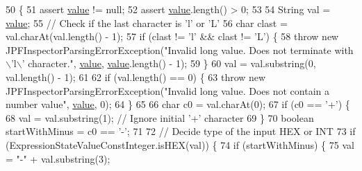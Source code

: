\begin{DoxyCode}
50                                                                                            \{
51     assert \hyperlink{classgov_1_1nasa_1_1jpf_1_1inspector_1_1server_1_1expression_1_1expressions_1_1_expression_state_value_const_long_aca83e5db34ca840e172b2ad55feb8c40}{value} != null;
52     assert \hyperlink{classgov_1_1nasa_1_1jpf_1_1inspector_1_1server_1_1expression_1_1expressions_1_1_expression_state_value_const_long_aca83e5db34ca840e172b2ad55feb8c40}{value}.length() > 0;
53 
54     String val = \hyperlink{classgov_1_1nasa_1_1jpf_1_1inspector_1_1server_1_1expression_1_1expressions_1_1_expression_state_value_const_long_aca83e5db34ca840e172b2ad55feb8c40}{value};
55     \textcolor{comment}{// Check if the last character is 'l' or 'L'}
56     \textcolor{keywordtype}{char} clast = val.charAt(val.length() - 1);
57     \textcolor{keywordflow}{if} (clast != \textcolor{charliteral}{'l'} && clast != \textcolor{charliteral}{'L'}) \{
58       \textcolor{keywordflow}{throw} \textcolor{keyword}{new} JPFInspectorParsingErrorException(\textcolor{stringliteral}{"Invalid long value. Does not terminate with \(\backslash\)'l\(\backslash\)'
       character."}, \hyperlink{classgov_1_1nasa_1_1jpf_1_1inspector_1_1server_1_1expression_1_1expressions_1_1_expression_state_value_const_long_aca83e5db34ca840e172b2ad55feb8c40}{value}, \hyperlink{classgov_1_1nasa_1_1jpf_1_1inspector_1_1server_1_1expression_1_1expressions_1_1_expression_state_value_const_long_aca83e5db34ca840e172b2ad55feb8c40}{value}.length() - 1);
59     \}
60     val = val.substring(0, val.length() - 1);
61 
62     \textcolor{keywordflow}{if} (val.length() == 0) \{
63       \textcolor{keywordflow}{throw} \textcolor{keyword}{new} JPFInspectorParsingErrorException(\textcolor{stringliteral}{"Invalid long value. Does not contain a number value"}, 
      \hyperlink{classgov_1_1nasa_1_1jpf_1_1inspector_1_1server_1_1expression_1_1expressions_1_1_expression_state_value_const_long_aca83e5db34ca840e172b2ad55feb8c40}{value}, 0);
64     \}
65 
66     \textcolor{keywordtype}{char} c0 = val.charAt(0);
67     \textcolor{keywordflow}{if} (c0 == \textcolor{charliteral}{'+'}) \{
68       val = val.substring(1); \textcolor{comment}{// Ignore initial '+' character}
69     \}
70     \textcolor{keywordtype}{boolean} startWithMinus = c0 == \textcolor{charliteral}{'-'};
71 
72     \textcolor{comment}{// Decide type of the input HEX or INT}
73     \textcolor{keywordflow}{if} (ExpressionStateValueConstInteger.isHEX(val)) \{
74       \textcolor{keywordflow}{if} (startWithMinus) \{
75         val = \textcolor{stringliteral}{"-"} + val.substring(3);

\end{DoxyCode}
